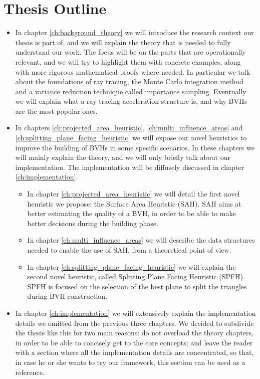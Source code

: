 \documentclass{PoliMi_MasterThesis}
\begin{document}
\section*{Thesis Outline}
\begin{itemize}
	\item In chapter \ref{ch:background_theory} we will introduce the research context our thesis is part of, and we will explain the theory that is needed to fully understand our work. The focus will be on the parts that are operationally relevant, and we will try to highlight them with concrete examples, along with more rigorous mathematical proofs where needed. In particular we talk about the foundations of ray tracing, the Monte Carlo integration method and a variance reduction technique called importance sampling. Eventually we will explain what a ray tracing acceleration structure is, and why BVHs are the most popular ones.
	\item In chapters \ref{ch:projected_area_heuristic}, \ref{ch:multi_influence_areas} and \ref{ch:splitting_plane_facing_heuristic} we will expose our novel heuristics to improve the building of BVHs in some specific scenarios. In these chapters we will mainly explain the theory, and we will only briefly talk about our implementation. The implementation will be diffusely discussed in chapter \ref{ch:implementation}.
	\begin{itemize}
		\item In chapter \ref{ch:projected_area_heuristic} we will detail the first novel heuristic we propose: the Surface Area Heuristic (SAH). SAH aims at better estimating the quality of a BVH, in order to be able to make better decisions during the building phase.
		\item In chapter \ref{ch:multi_influence_areas} we will describe the data structures needed to enable the use of SAH, from a theoretical point of view.
		\item In chapter \ref{ch:splitting_plane_facing_heuristic} we will explain the second novel heuristic, called Splitting Plane Facing Heuristic (SPFH). SPFH is focused on the selection of the best plane to split the triangles during BVH construction.
	\end{itemize}
	\item In chapter \ref{ch:implementation} we will extensively explain the implementation details we omitted from the previous three chapters. We decided to subdivide the thesis like this for two main reasons: do not overload the theory chapters, in order to be able to concisely get to the core concepts; and leave the reader with a section where all the implementation details are concentrated, so that, in case he or she wants to try our framework, this section can be used as a reference.

\end{itemize}
\end{document}
